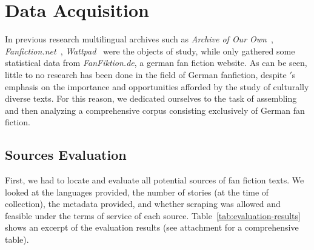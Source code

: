 \chapter{Data Acquisition}\label{ch:data-acquisition}



In previous research multilingual archives such as \emph{Archive of Our Own}~\citep{Duggan2020WhoAO3, Cuntz-Leng2015AGermany, Kleindienst2020InvestigatingSupernatural, Schmidt2022AnalyzingOwn}, \emph{Fanfiction.net}~\citep{Milli2016BeyondFanfiction, Vilares2019HarryLanguage}, \emph{Wattpad}~\citep{Fast2016ShirtlessCommunity, Liu2019DENS:Analysis, Zhang2019GeneratingFiction} were the objects of study, while only \citet{Cuntz-Leng2015AGermany} gathered some statistical data from \emph{FanFiktion.de}, a german fan fiction website.
As can be seen, little to no research has been done in the field of German fanfiction, despite \citeauthor{Cuntz-Leng2015AGermany}$'$s~\citeyearpar{Cuntz-Leng2015AGermany} emphasis on the importance and opportunities afforded by the study of culturally diverse texts.
For this reason, we dedicated ourselves to the task of assembling and then analyzing a comprehensive corpus consisting exclusively of German fan fiction.


\section{Sources Evaluation}\label{sec:sources-evaluation}
First, we had to locate and evaluate all potential sources of fan fiction texts.
We looked at the languages provided, the number of stories (at the time of collection), the metadata provided, and whether scraping was allowed and feasible under the terms of service of each source.
Table~\ref{tab:evaluation-results} shows an excerpt of the evaluation results (see attachment for a comprehensive table).

